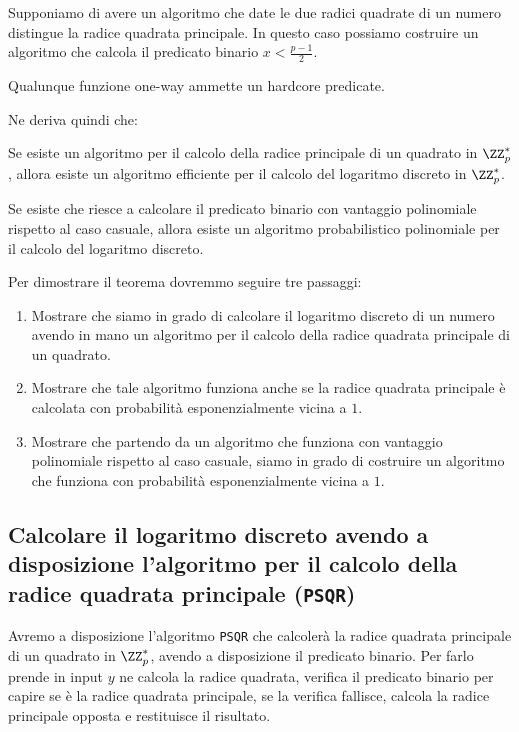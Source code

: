   Supponiamo di avere un algoritmo che date le due radici quadrate di un numero 
  distingue la radice quadrata principale. In questo caso possiamo costruire
  un algoritmo che calcola il predicato binario $x < \frac{p-1}{2}$.
  \begin{theorem}
    Qualunque funzione one-way ammette un hardcore predicate.
  \end{theorem}
  Ne deriva quindi che:
  \begin{theorem}
  Se esiste un algoritmo per il calcolo della radice principale 
  di un quadrato in $\ZZ_p^*$, allora esiste un algoritmo efficiente
  per il calcolo del logaritmo discreto in $\ZZ_p^*$.
\end{theorem}
\begin{theorem}
  Se esiste che riesce  a calcolare il predicato binario con vantaggio 
  polinomiale rispetto al caso casuale, allora esiste un algoritmo
  probabilistico polinomiale per il calcolo del logaritmo discreto.
\end{theorem}
Per dimostrare il teorema dovremmo seguire tre passaggi:
\begin{enumerate}
  \item Mostrare che siamo in grado di calcolare il logaritmo discreto
  di un numero avendo in mano un algoritmo per il calcolo della radice
  quadrata principale di un quadrato.
  \item Mostrare che tale algoritmo funziona anche se la 
  radice quadrata principale è calcolata con probabilità 
  esponenzialmente vicina a $1$.
  \item Mostrare che partendo da un algoritmo che funziona con vantaggio 
  polinomiale rispetto al caso casuale, siamo in grado di costruire un
  algoritmo che funziona con probabilità esponenzialmente vicina a $1$.
\end{enumerate}
\subsection{Calcolare il logaritmo discreto avendo a disposizione
l'algoritmo per il calcolo della radice quadrata principale (\texttt{PSQR})}
Avremo a disposizione l'algoritmo \texttt{PSQR} che calcolerà la radice
quadrata principale di un quadrato in $\ZZ_p^*$, avendo a disposizione 
il predicato binario. Per farlo prende in input $y$ ne calcola la radice 
quadrata, verifica il predicato binario per capire se è la radice quadrata
principale, se la verifica fallisce, calcola la radice principale 
opposta e restituisce il risultato.

